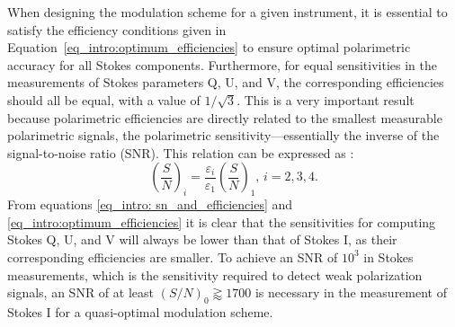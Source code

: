 When designing the modulation scheme for a given instrument, it is essential to satisfy the efficiency conditions given in Equation~\eqref{eq_intro:optimum_efficiencies} to ensure optimal polarimetric accuracy for all Stokes components. Furthermore, for equal sensitivities in the measurements of Stokes parameters Q, U, and V, the corresponding efficiencies should all be equal, with a value of $1/\sqrt{3}$. This is a very important result because polarimetric efficiencies are directly related to the smallest measurable polarimetric signals, the polarimetric sensitivity—essentially the inverse of the signal-to-noise ratio (SNR). This relation can be expressed as \citep{optimum_modulation}:
\begin{equation}
  \left( \frac{S}{N}\right)_i = \frac{\varepsilon _ i}{\varepsilon _ 1} \left(\frac{S}{N}\right)_1 \text{,    } i = 2, 3, 4 .
  \label{eq_intro: sn_and_efficiencies}
\end{equation}
From equations \eqref{eq_intro: sn_and_efficiencies} and \eqref{eq_intro:optimum_efficiencies} it is clear that the sensitivities for computing Stokes Q, U, and V will always be lower than that of Stokes I, as their corresponding efficiencies are smaller. To achieve an SNR of $10^3$ in Stokes measurements, which is the sensitivity required to detect weak polarization signals, an SNR of at least $ \left(S/N \right)_0 \gtrapprox 1700$ is necessary in the measurement of Stokes I for a quasi-optimal modulation scheme.

